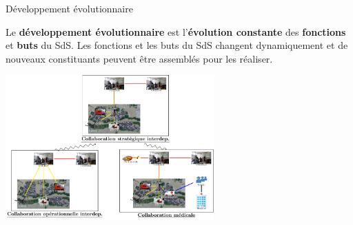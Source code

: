 \begin{frame}{Développement évolutionnaire}
\begin{block}{}
Le \textbf{développement évolutionnaire} est l'\textbf{évolution
constante} des
\textbf{fonctions} et \textbf{buts} du SdS. Les fonctions et les buts du SdS changent
dynamiquement et de nouveaux constituants peuvent être assemblés pour
les réaliser.
\end{block}
\centering
\includegraphics[width=8cm]{imgs/dev_evolutionnaire.pdf}
\end{frame}
%


